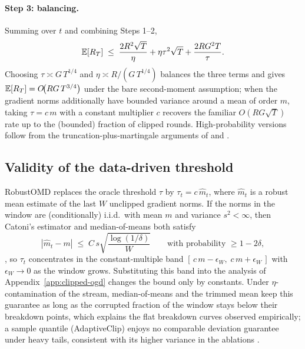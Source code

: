 \paragraph{Step 3: balancing.} Summing over $t$ and combining Steps 1--2,
\begin{equation}
\mathbb{E}[R_T] \;\le\; \frac{2R^2\sqrt{T}}{\eta} + \eta \tau^2 \sqrt{T} + \frac{2RG^2 T}{\tau}.
\end{equation}
Choosing $\tau \asymp G\,T^{1/4}$ and $\eta \asymp R / (G\,T^{1/4})$ balances the three
terms and gives $\mathbb{E}[R_T] = O\!\bigl( R G \, T^{3/4} \bigr)$ under the bare second-moment
assumption; when the gradient norms additionally have bounded variance around a mean of
order $m$, taking $\tau = c\,m$ with a constant multiplier $c$ recovers the familiar
$O(RG\sqrt{T})$ rate up to the (bounded) fraction of clipped rounds. High-probability
versions follow from the truncation-plus-martingale arguments of
\citet{cutkosky2021high} and \citet{zhang2020adaptive}.

\subsection{Validity of the data-driven threshold}
\label{app:threshold}

RobustOMD replaces the oracle threshold $\tau$ by $\tau_t = c\,\hat{m}_t$, where
$\hat{m}_t$ is a robust mean estimate of the last $W$ unclipped gradient norms. If the
norms in the window are (conditionally) i.i.d.\ with mean $m$ and variance
$s^2 < \infty$, then Catoni's estimator and median-of-means both satisfy
\begin{equation}
| \hat{m}_t - m | \;\le\; C\, s \sqrt{\frac{\log(1/\delta)}{W}}
\qquad \text{with probability } \ge 1 - 2\delta,
\end{equation}
\citep{catoni2012challenging,devroye2016sub,lugosi2019mean}, so $\tau_t$ concentrates in
the constant-multiple band $[\,c\,m - \epsilon_W,\; c\,m + \epsilon_W\,]$ with
$\epsilon_W \to 0$ as the window grows. Substituting this band into the analysis of
Appendix~\ref{app:clipped-ogd} changes the bound only by constants. Under
$\eta$-contamination of the stream, median-of-means and the trimmed mean keep this
guarantee as long as the corrupted fraction of the window stays below their breakdown
points, which explains the flat breakdown curves observed empirically; a sample quantile
(AdaptiveClip) enjoys no comparable deviation guarantee under heavy tails, consistent
with its higher variance in the ablations \citep{bubeck2013bandits}.

